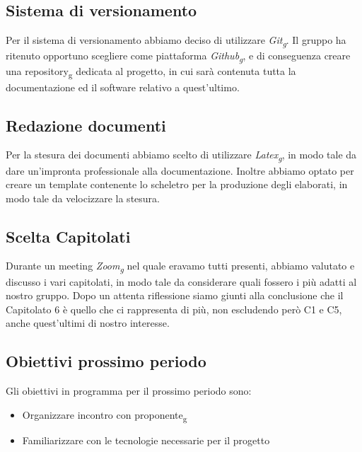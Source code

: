 \subsection{Sistema di versionamento}
Per il sistema di versionamento abbiamo deciso di utilizzare \textit{Git\textsubscript{g}}.  Il gruppo ha ritenuto opportuno scegliere come piattaforma \textit{Github\textsubscript{g}}, e di conseguenza creare una repository\textsubscript{g} dedicata al progetto, in cui sarà contenuta tutta la documentazione ed il software relativo a quest'ultimo.

\subsection{Redazione documenti}
Per la stesura dei documenti abbiamo scelto di utilizzare \textit{Latex\textsubscript{g}}, in modo tale da dare un'impronta professionale alla documentazione.  Inoltre abbiamo optato per creare un template contenente lo scheletro per la produzione degli elaborati,  in modo tale da velocizzare la stesura.

\subsection{Scelta Capitolati}
Durante un meeting \textit{Zoom\textsubscript{g}} nel quale eravamo tutti presenti, abbiamo valutato e discusso i vari capitolati,  in modo tale da considerare quali fossero i più adatti al nostro gruppo.  Dopo un attenta riflessione siamo giunti alla conclusione che il Capitolato 6 è quello che ci rappresenta  di più,  non escludendo però C1 e C5, anche quest'ultimi di nostro interesse.

\subsection{Obiettivi prossimo periodo}
Gli obiettivi in programma per il prossimo periodo sono:
\begin{itemize}
\item Organizzare incontro con proponente\textsubscript{g}
\item Familiarizzare con le tecnologie necessarie per il progetto
\end{itemize}

